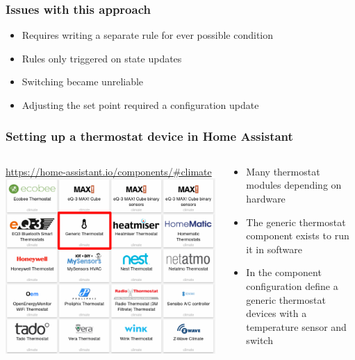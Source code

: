 \documentclass[aspectratio=169,11pt,hyperref={colorlinks=true}]{beamer}
\begin{document}
\begin{frame}
    \frametitle{Issues with this approach}
    \begin{itemize}
        \item Requires writing a separate rule for ever possible condition
        \item Rules only triggered on state updates
        \item Switching became unreliable
        \item Adjusting the set point required a configuration update
    \end{itemize}
\end{frame}

\begin{frame}
    \frametitle{Setting up a thermostat device in Home Assistant}
    \begin{columns}[T]
        \begin{column}{.48\textwidth}
            \begin{center}
                \href{https://home-assistant.io/components/\#climate}{https://home-assistant.io/components/\#climate}
                \includegraphics[width=\textwidth]{thermostat_components_2.png}
            \end{center}
        \end{column}
        \begin{column}{.48\textwidth}
            \begin{itemize}
                \item Many thermostat modules depending on hardware
                \item The generic thermostat component exists to run it in
                    software
                \item In the component configuration define a generic thermostat
                    devices with a temperature sensor and switch
            \end{itemize}
        \end{column}
    \end{columns}
\end{frame}
\end{document}
